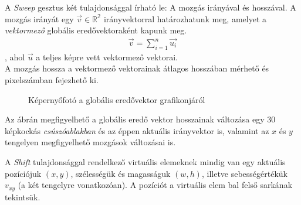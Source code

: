 A \textit{Sweep} gesztus két tulajdonsággal írható le: A mozgás irányával és hosszával. A mozgás irányát egy $\vec{v}\in\mathbb{R^2}$ irányvektorral határozhatunk meg, amelyet a \textit{vektormező} globális eredővektoraként kapunk meg.
\begin{align*}
  \vec{v} = \sum_{i=1}^n\vec{u_i}
\end{align*}
, ahol $\vec{u}$ a teljes képre vett vektormező vektorai.\\
A mozgás hossza a vektormező vektorainak átlagos hosszában mérhető és pixelszámban fejezhető ki.
\begin{figure}[h]
\centering
{}
\caption{Képernyőfotó a globális eredővektor grafikonjáról}
\label{fig:resultantplot}
\end{figure}

Az ábrán megfigyelhető a globális eredő vektor hosszainak változása egy 30 képkockás \textit{csúszóablakban} és az éppen aktuális irányvektor is, valamint az $x$ és $y$ tengelyen megfigyelhető mozgások változásai is.


A \textit{Shift} tulajdonsággal rendelkező virtuális elemeknek mindig van egy aktuális pozíciójuk $(x,y)$, szélességük és magasságuk $(w,h)$, illetve sebességértékük $v_{xy}$ (a két tengelyre vonatkozóan). A pozíciót a virtuális elem bal felső sarkának tekintsük.

